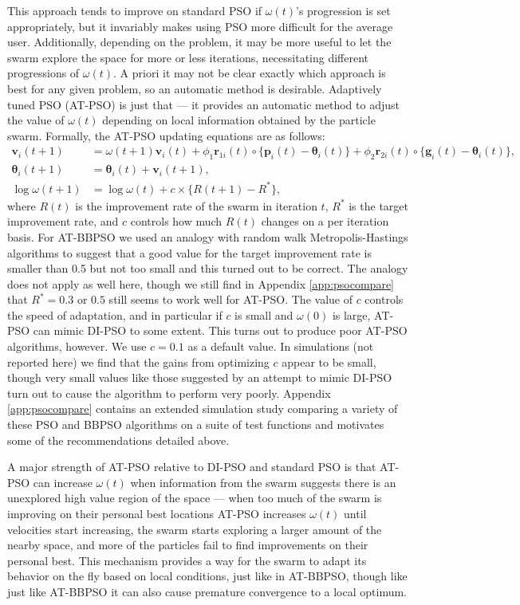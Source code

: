 \documentclass[12pt]{article}
\begin{document}
This approach tends to improve on standard PSO if $\omega(t)$'s progression is set appropriately, but it invariably makes using PSO more difficult for the average user. Additionally, depending on the problem, it may be more useful to let the swarm explore the space for more or less iterations, necessitating different progressions of $\omega(t)$. A priori it may not be clear exactly which approach is best for any given problem, so an automatic method is desirable. Adaptively tuned PSO (AT-PSO) is just that --- it provides an automatic method to adjust the value of $\omega(t)$ depending on local information obtained by the particle swarm. Formally, the AT-PSO updating equations are as follows:
\begin{align}\label{eq:atpso}
\bm{v}_i(t+1) &= \omega(t+1) \bm{v}_i(t) + \phi_1 \bm{r}_{1i}(t)\circ\{\bm{p}_i(t) - \bm{\theta}_i(t)\} + \phi_2 \bm{r}_{2i}(t)\circ\{\bm{g}_i(t) - \bm{\theta}_i(t)\},\nonumber\\
\bm{\theta}_i(t+1) &= \bm{\theta}_i(t) + \bm{v}_i(t+1),\nonumber\\
\log\omega(t+1)& = \log\omega(t) + c\times\{R(t+1) - R^*\},
\end{align}
where $R(t)$ is the improvement rate of the swarm in iteration $t$, $R^*$ is the target improvement rate, and $c$ controls how much $R(t)$ changes on a per iteration basis. For AT-BBPSO we used an analogy with random walk Metropolis-Hastings algorithms to suggest that a good value for the target improvement rate is smaller than 0.5 but not too small and this turned out to be correct. The analogy does not apply as well here, though we still find in Appendix \ref{app:psocompare} that $R^*=0.3$ or $0.5$ still seems to work well for AT-PSO. The value of $c$ controls the speed of adaptation, and in particular if $c$ is small and $\omega(0)$ is large, AT-PSO can mimic DI-PSO to some extent. This turns out to produce poor AT-PSO algorithms, however. We use $c=0.1$ as a default value. In simulations (not reported here) we find that the gains from optimizing $c$ appear to be small, though very small values like those suggested by an attempt to mimic DI-PSO turn out to cause the algorithm to perform very poorly. Appendix \ref{app:psocompare} contains an extended simulation study comparing a variety of these PSO and BBPSO algorithms on a suite of test functions and motivates some of the recommendations detailed above.

A major strength of AT-PSO relative to DI-PSO and standard PSO is that AT-PSO can increase $\omega(t)$ when information from the swarm suggests there is an unexplored high value region of the space --- when too much of the swarm is improving on their personal best locations AT-PSO increases $\omega(t)$ until velocities start increasing, the swarm starts exploring a larger amount of the nearby space, and more of the particles fail to find improvements on their personal best. This mechanism provides a way for the swarm to adapt its behavior on the fly based on local conditions, just like in AT-BBPSO, though like just like AT-BBPSO it can also cause premature convergence to a local optimum.
\end{document}

